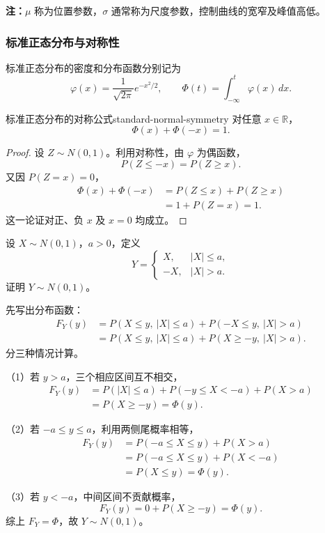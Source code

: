 \textbf{注：}\quad $\mu$ 称为位置参数，$\sigma$ 通常称为尺度参数，控制曲线的宽窄及峰值高低。

\subsubsection*{标准正态分布与对称性}

标准正态分布的密度和分布函数分别记为
\[
\varphi(x)=\frac1{\sqrt{2\pi}}e^{-x^2/2},
\qquad
\Phi(t)=\int_{-\infty}^t\varphi(x)\,dx.
\]

\begin{proposition}{标准正态分布的对称公式}{standard-normal-symmetry}
对任意 $x\in\mathbb R$，
\[
\Phi(x)+\Phi(-x)=1.
\]
\end{proposition}

\begin{proof}
设 $Z\sim N(0,1)$。利用对称性，由 $\varphi$ 为偶函数，
\[
P(Z\leq-x)=P(Z\geq x).
\]
又因 $P(Z=x)=0$，
\[
\begin{aligned}
\Phi(x)+\Phi(-x)
&=P(Z\leq x)+P(Z\geq x)\\
&=1+P(Z=x)=1.
\end{aligned}
\]
这一论证对正、负 $x$ 及 $x=0$ 均成立。
\end{proof}

\begin{example}[对两侧尾部作符号翻转]
设 $X\sim N(0,1)$，$a>0$，定义
\[
Y=
\begin{cases}
X,&|X|\leq a,\\
-X,&|X|>a.
\end{cases}
\]
证明 $Y\sim N(0,1)$。

先写出分布函数：
\[
\begin{aligned}
F_Y(y)
&=P(X\leq y,\ |X|\leq a)
+P(-X\leq y,\ |X|>a)\\
&=P(X\leq y,\ |X|\leq a)
+P(X\geq-y,\ |X|>a).
\end{aligned}
\]
分三种情况计算。

（1）若 $y>a$，三个相应区间互不相交，
\[
\begin{aligned}
F_Y(y)
&=P(|X|\leq a)+P(-y\leq X<-a)+P(X>a)\\
&=P(X\geq-y)=\Phi(y).
\end{aligned}
\]

（2）若 $-a\leq y\leq a$，利用两侧尾概率相等，
\[
\begin{aligned}
F_Y(y)
&=P(-a\leq X\leq y)+P(X>a)\\
&=P(-a\leq X\leq y)+P(X<-a)\\
&=P(X\leq y)=\Phi(y).
\end{aligned}
\]

（3）若 $y<-a$，中间区间不贡献概率，
\[
F_Y(y)=0+P(X\geq-y)=\Phi(y).
\]
综上 $F_Y=\Phi$，故 $Y\sim N(0,1)$。
\end{example}

